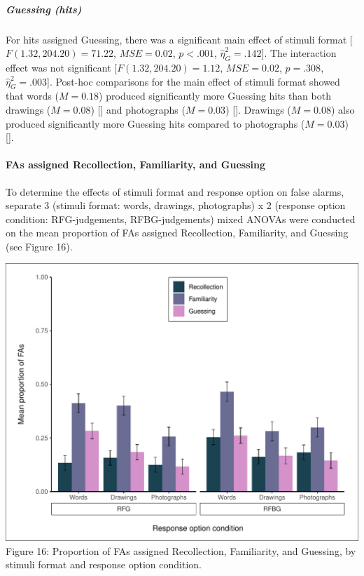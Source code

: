 \documentclass[
  11pt,
]{article}
\begin{document}
\hypertarget{guessing-hits}{%
\subparagraph{Guessing (hits)}\label{guessing-hits}}

For hits assigned Guessing, there was a significant main effect of
stimuli format {[}\(F(1.32, 204.20) = 71.22\), \(\mathit{MSE} = 0.02\),
\(p < .001\), \(\hat{\eta}^2_G = .142\){]}. The interaction effect was
not significant {[}\(F(1.32, 204.20) = 1.12\), \(\mathit{MSE} = 0.02\),
\(p = .308\), \(\hat{\eta}^2_G = .003\){]}. Post-hoc comparisons for the
main effect of stimuli format showed that words (\(M = 0.18\)) produced
significantly more Guessing hits than both drawings (\(M = 0.08\))
{[}{]} and photographs (\(M = 0.03\)) {[}{]}. Drawings (\(M = 0.08\))
also produced significantly more Guessing hits compared to photographs
(\(M = 0.03\)) {[}{]}.

\hypertarget{fas-assigned-recollection-familiarity-and-guessing}{%
\paragraph{FAs assigned Recollection, Familiarity, and
Guessing}\label{fas-assigned-recollection-familiarity-and-guessing}}

To determine the effects of stimuli format and response option on false
alarms, separate 3 (stimuli format: words, drawings, photographs) x 2
(response option condition: RFG-judgements, RFBG-judgements) mixed
ANOVAs were conducted on the mean proportion of FAs assigned
Recollection, Familiarity, and Guessing (see Figure 16).

\includegraphics{R--Thesis_files/figure-latex/unnamed-chunk-42-1.pdf}
Figure 16: Proportion of FAs assigned Recollection, Familiarity, and
Guessing, by stimuli format and response option condition.
\end{document}
